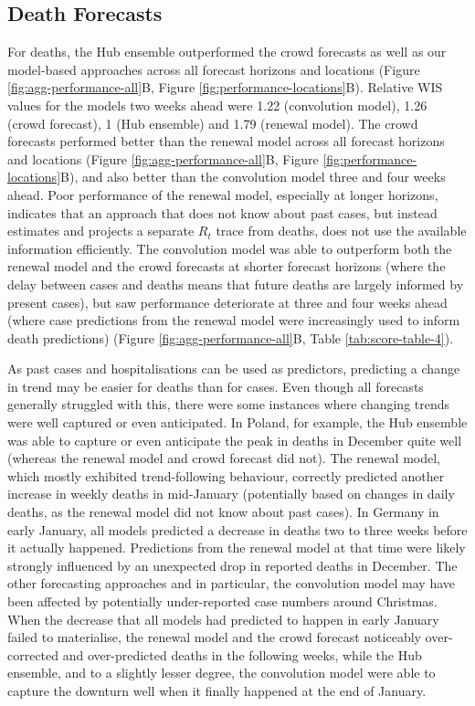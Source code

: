 \documentclass[
]{article}
\begin{document}
\hypertarget{death-forecasts}{%
\subsection{Death Forecasts}\label{death-forecasts}}

For deaths, the Hub ensemble outperformed the crowd forecasts as well as our model-based approaches across all forecast horizons and locations (Figure \ref{fig:agg-performance-all}B, Figure \ref{fig:performance-locations}B). Relative WIS values for the models two weeks ahead were 1.22 (convolution model), 1.26 (crowd forecast), 1 (Hub ensemble) and 1.79 (renewal model). The crowd forecasts performed better than the renewal model across all forecast horizons and locations (Figure \ref{fig:agg-performance-all}B, Figure \ref{fig:performance-locations}B), and also better than the convolution model three and four weeks ahead. Poor performance of the renewal model, especially at longer horizons, indicates that an approach that does not know about past cases, but instead estimates and projects a separate \(R_t\) trace from deaths, does not use the available information efficiently. The convolution model was able to outperform both the renewal model and the crowd forecasts at shorter forecast horizons (where the delay between cases and deaths means that future deaths are largely informed by present cases), but saw performance deteriorate at three and four weeks ahead (where case predictions from the renewal model were increasingly used to inform death predictions) (Figure \ref{fig:agg-performance-all}B, Table \ref{tab:score-table-4}).

As past cases and hospitalisations can be used as predictors, predicting a change in trend may be easier for deaths than for cases. Even though all forecasts generally struggled with this, there were some instances where changing trends were well captured or even anticipated. In Poland, for example, the Hub ensemble was able to capture or even anticipate the peak in deaths in December quite well (whereas the renewal model and crowd forecast did not). The renewal model, which mostly exhibited trend-following behaviour, correctly predicted another increase in weekly deaths in mid-January (potentially based on changes in daily deaths, as the renewal model did not know about past cases). In Germany in early January, all models predicted a decrease in deaths two to three weeks before it actually happened. Predictions from the renewal model at that time were likely strongly influenced by an unexpected drop in reported deaths in December. The other forecasting approaches and in particular, the convolution model may have been affected by potentially under-reported case numbers around Christmas. When the decrease that all models had predicted to happen in early January failed to materialise, the renewal model and the crowd forecast noticeably over-corrected and over-predicted deaths in the following weeks, while the Hub ensemble, and to a slightly lesser degree, the convolution model were able to capture the downturn well when it finally happened at the end of January.
\end{document}
